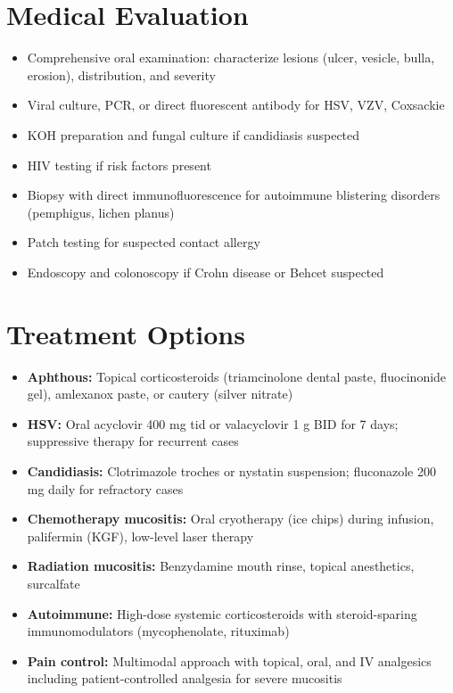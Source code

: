 \section*{Medical Evaluation}
\begin{itemize}
  \item Comprehensive oral examination: characterize lesions (ulcer, vesicle, bulla, erosion), distribution, and severity
  \item Viral culture, PCR, or direct fluorescent antibody for HSV, VZV, Coxsackie
  \item KOH preparation and fungal culture if candidiasis suspected
  \item HIV testing if risk factors present
  \item Biopsy with direct immunofluorescence for autoimmune blistering disorders (pemphigus, lichen planus)
  \item Patch testing for suspected contact allergy
  \item Endoscopy and colonoscopy if Crohn disease or Behcet suspected
\end{itemize}

\section*{Treatment Options}
\begin{itemize}
  \item \textbf{Aphthous:} Topical corticosteroids (triamcinolone dental paste, fluocinonide gel), amlexanox paste, or cautery (silver nitrate)
  \item \textbf{HSV:} Oral acyclovir 400 mg tid or valacyclovir 1 g BID for 7 days; suppressive therapy for recurrent cases
  \item \textbf{Candidiasis:} Clotrimazole troches or nystatin suspension; fluconazole 200 mg daily for refractory cases
  \item \textbf{Chemotherapy mucositis:} Oral cryotherapy (ice chips) during infusion, palifermin (KGF), low-level laser therapy
  \item \textbf{Radiation mucositis:} Benzydamine mouth rinse, topical anesthetics, surcalfate
  \item \textbf{Autoimmune:} High-dose systemic corticosteroids with steroid-sparing immunomodulators (mycophenolate, rituximab)
  \item \textbf{Pain control:} Multimodal approach with topical, oral, and IV analgesics including patient-controlled analgesia for severe mucositis
\end{itemize}

